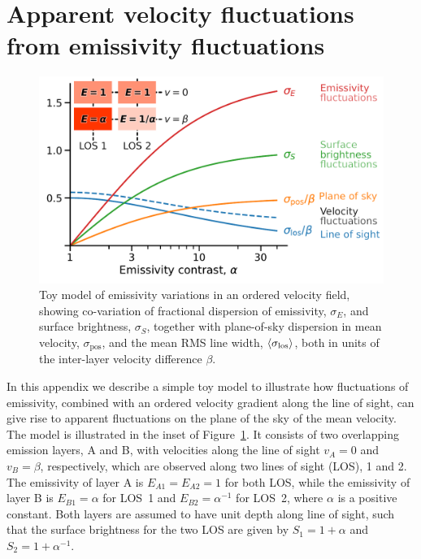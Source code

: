 \documentclass[fleqn,usenatbib, useAMS, a4paper]{mnras}
\newcommand\pos{\ensuremath{_{\mathrm{pos}}}}
\begin{document}
\FloatBarrier

\section{Apparent velocity fluctuations from emissivity fluctuations}
\label{sec:appar-veloc-fluct}

\begin{figure}
  \centering
  \includegraphics[width=\linewidth]{Figures/bright-to-vel-fluct-annotated}
  \caption{
    Toy model of emissivity variations in an ordered velocity field,
    showing co-variation of fractional dispersion of
    emissivity, \(\sigma_E\), and surface brightness, \(\sigma_S\),
    together with plane-of-sky dispersion in mean velocity,
    \(\sigma\pos\),
    and the mean RMS line width, \(\langle\sigma_{\mathrm{los}}\rangle\),
    both in units of the inter-layer velocity difference \(\beta\).
  }
  \label{fig:bright-to-vel-fluct}
\end{figure}

In this appendix we describe a simple toy model to illustrate
how fluctuations of emissivity,
combined with an ordered velocity gradient along the line of sight,
can give rise to apparent fluctuations on the plane of the sky
of the mean velocity.
The model is illustrated in the inset of Figure~\ref{fig:bright-to-vel-fluct}.
It consists of two overlapping emission layers, A and B,
with velocities along the line of sight \(v_A = 0\) and \(v_B = \beta\), respectively,
which are observed along two lines of sight (LOS), 1 and 2.
The emissivity of layer A is \(E_{A1} = E_{A2} = 1\) for both LOS,
while the emissivity of layer B is \(E_{B1} = \alpha\) for LOS~1
and \(E_{B2} = \alpha^{-1}\) for LOS~2, where \(\alpha\) is a positive constant.
Both layers are assumed to have unit depth along line of sight,
such that the surface brightness for the two LOS are given by
\(S_1 = 1 + \alpha\) and \(S_2 = 1 + \alpha^{-1}\).
\end{document}
